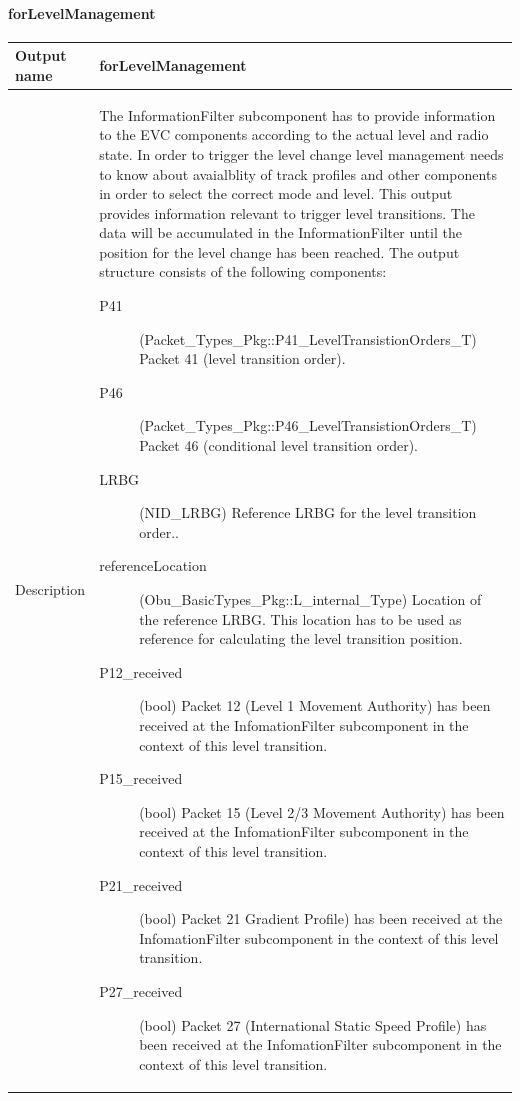 \paragraph{forLevelManagement}

\begin{longtable}{p{}p{}}
\toprule
Output name				& forLevelManagement \\
\midrule
Description				& The InformationFilter subcomponent has to provide information to the EVC components according to the actual level and radio state. In order to trigger the level change level management needs to know about avaialblity of track profiles and other components in order to select the correct mode and level. This output provides information relevant to trigger level transitions. The data will be accumulated in the InformationFilter until the position for the level change has been reached. The output structure consists of the following components:
\begin{description}
\item[P41](Packet\_Types\_Pkg::P41\_LevelTransistionOrders\_T) Packet 41 (level transition order). 
\item[P46](Packet\_Types\_Pkg::P46\_LevelTransistionOrders\_T) Packet 46 (conditional level transition order). 
\item[LRBG](NID\_LRBG) Reference LRBG for the level transition order..
\item[referenceLocation](Obu\_BasicTypes\_Pkg::L\_internal\_Type) Location of the reference LRBG. This location has to be used as reference for calculating the level transition position. 
\item[P12\_received](bool) Packet 12 (Level 1 Movement Authority) has been received at the InfomationFilter subcomponent in the context of this level transition. 
\item[P15\_received](bool) Packet 15 (Level 2/3 Movement Authority) has been received at the InfomationFilter subcomponent in the context of this level transition. 
\item[P21\_received](bool) Packet 21 Gradient Profile) has been received at the InfomationFilter subcomponent in the context of this level transition. 
\item[P27\_received](bool) Packet 27 (International Static Speed Profile) has been received at the InfomationFilter subcomponent in the context of this level transition. 
\end{description}


\end{longtable}
